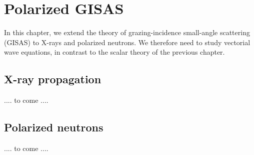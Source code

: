 
\chapter{Polarized GISAS}  

In this chapter,
we extend the theory
of grazing-incidence small-angle scattering (GISAS)
to X-rays and polarized neutrons.
We therefore need to study vectorial wave equations,
in contrast to the scalar theory of the previous chapter.

\section{X-ray propagation}\label{Sxray}

.... to come ....


\section{Polarized neutrons}\label{Snpol}


.... to come ....

